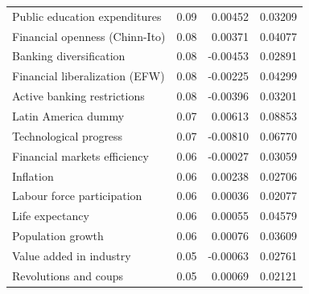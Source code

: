 \documentclass[a4paper,11pt]{article}
\begin{document}
\begin{table}[!ht]
\begin{tabular}{lrrr}
  Public education expenditures & 0.09 & 0.00452 & 0.03209 \\ 
  Financial openness (Chinn-Ito) & 0.08 & 0.00371 & 0.04077 \\ 
  Banking diversification & 0.08 & -0.00453 & 0.02891 \\ 
  Financial liberalization (EFW) & 0.08 & -0.00225 & 0.04299 \\ 
  Active banking restrictions & 0.08 & -0.00396 & 0.03201 \\ 
  Latin America dummy & 0.07 & 0.00613 & 0.08853 \\ 
  Technological progress & 0.07 & -0.00810 & 0.06770 \\ 
  Financial markets efficiency & 0.06 & -0.00027 & 0.03059 \\ 
  Inflation & 0.06 & 0.00238 & 0.02706 \\ 
  Labour force participation & 0.06 & 0.00036 & 0.02077 \\ 
  Life expectancy & 0.06 & 0.00055 & 0.04579 \\ 
  Population growth & 0.06 & 0.00076 & 0.03609 \\ 
  Value added in industry & 0.05 & -0.00063 & 0.02761 \\ 
  Revolutions and coups & 0.05 & 0.00069 & 0.02121 \\ 
   \bottomrule
\end{tabular}
\end{table}

\clearpage
\end{document}
